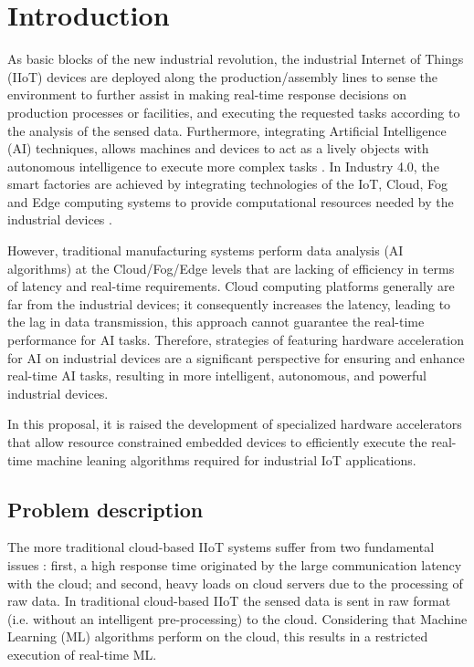 \section{Introduction}
As basic blocks of the new industrial revolution, the industrial Internet of Things (IIoT) devices are deployed along the production/assembly lines to sense the environment to further assist in making real-time response decisions on production processes or facilities, and executing the requested tasks according to the analysis of the sensed data. Furthermore, integrating Artificial Intelligence (AI) techniques, allows machines and devices to act as a lively objects with autonomous intelligence to execute more complex tasks \cite{lin2018cost}. In Industry 4.0, the smart factories are achieved by integrating technologies of the IoT, Cloud, Fog and Edge computing systems to provide computational resources needed by the industrial devices \cite{georgakopoulos2016internet, sisinni2018industrial}.

However, traditional manufacturing systems perform data analysis (AI algorithms) at the Cloud/Fog/Edge levels that are lacking of efficiency in terms of latency and real-time requirements. Cloud computing platforms generally are far from the industrial devices; it consequently increases the latency, leading to the lag in data transmission, this approach cannot guarantee the real-time performance for AI tasks. Therefore, strategies of featuring hardware acceleration for AI on industrial devices are a significant perspective for ensuring and enhance real-time AI tasks, resulting in more intelligent, autonomous, and powerful industrial devices.

In this proposal, it is raised the development of specialized hardware accelerators that allow resource constrained embedded devices to efficiently execute the real-time machine leaning algorithms required for industrial IoT applications.

\subsection{Problem description}
The more traditional cloud-based IIoT systems suffer from two fundamental issues \cite{de2018application}: first, a high response time originated by the large communication latency with the cloud; and second, heavy loads on cloud servers due to the processing of raw data. In traditional cloud-based IIoT the sensed data is sent in raw format (i.e. without an intelligent pre-processing) to the cloud. Considering that Machine Learning (ML) algorithms perform on the cloud, this results in a restricted execution of real-time ML.


